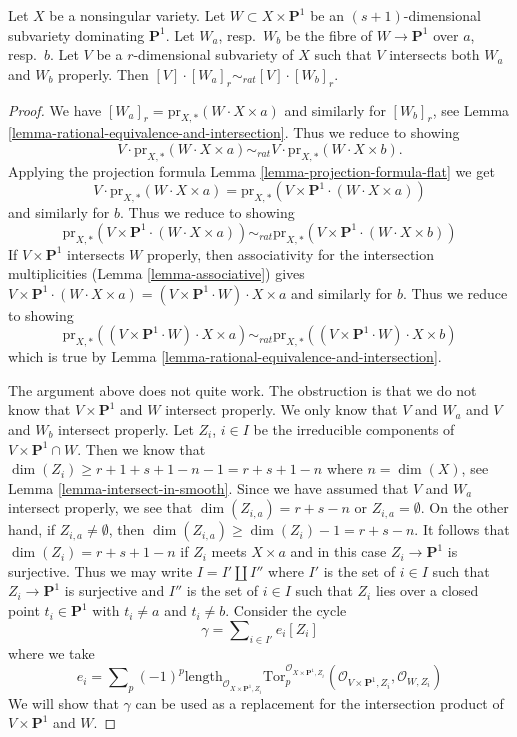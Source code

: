 \begin{lemma}
\label{lemma-well-defined-special-case}
Let $X$ be a nonsingular variety. Let
$W \subset X \times \mathbf{P}^1$ be an $(s + 1)$-dimensional subvariety
dominating $\mathbf{P}^1$. Let $W_a$, resp.\ $W_b$ be the fibre of
$W \to \mathbf{P}^1$ over $a$, resp.\ $b$. Let $V$ be a $r$-dimensional
subvariety of $X$ such that $V$ intersects both $W_a$ and
$W_b$ properly. Then $[V] \cdot [W_a]_r \sim_{rat} [V] \cdot [W_b]_r$.
\end{lemma}

\begin{proof}
We have $[W_a]_r = \text{pr}_{X,*}(W \cdot X \times a)$ and similarly for
$[W_b]_r$, see Lemma \ref{lemma-rational-equivalence-and-intersection}.
Thus we reduce to showing
$$
V \cdot \text{pr}_{X,*}( W \cdot X \times a) \sim_{rat} V \cdot
\text{pr}_{X,*}( W \cdot X\times b).
$$
Applying the projection formula
Lemma \ref{lemma-projection-formula-flat} we get
$$
V \cdot \text{pr}_{X,*}( W \cdot X\times a) =
\text{pr}_{X,*}(V \times \mathbf{P}^1 \cdot (W \cdot X\times a))
$$
and similarly for $b$. Thus we reduce to showing
$$
\text{pr}_{X,*}(V \times \mathbf{P}^1 \cdot (W \cdot X\times a))
\sim_{rat}
\text{pr}_{X,*}(V \times \mathbf{P}^1 \cdot (W \cdot X\times b))
$$
If $V \times \mathbf{P}^1$ intersects $W$ properly, then
associativity for the intersection multiplicities
(Lemma \ref{lemma-associative})
gives $V \times \mathbf{P}^1 \cdot (W \cdot X\times a) =
(V \times \mathbf{P}^1 \cdot W) \cdot X \times a$
and similarly for $b$.  Thus we reduce to showing
$$
\text{pr}_{X,*}((V \times \mathbf{P}^1 \cdot W) \cdot X\times a)
\sim_{rat}
\text{pr}_{X,*}((V \times \mathbf{P}^1 \cdot W) \cdot X\times b)
$$
which is true by Lemma \ref{lemma-rational-equivalence-and-intersection}.

\medskip\noindent
The argument above does not quite work. The obstruction is that
we do not know that $V \times \mathbf{P}^1$ and $W$ intersect properly.
We only know that $V$ and $W_a$ and $V$ and $W_b$ intersect properly.
Let $Z_i$, $i \in I$ be the irreducible components of
$V \times \mathbf{P}^1 \cap W$. Then we know that
$\dim(Z_i) \geq r + 1 + s + 1 - n - 1 = r + s + 1 - n$ where $n = \dim(X)$, see
Lemma \ref{lemma-intersect-in-smooth}. Since we have assumed
that $V$ and $W_a$ intersect properly, we see that
$\dim(Z_{i, a}) = r + s - n$ or $Z_{i, a} = \emptyset$.
On the other hand, if $Z_{i, a} \not = \emptyset$, then
$\dim(Z_{i, a}) \geq \dim(Z_i) - 1 = r + s - n$.
It follows that $\dim(Z_i) = r + s + 1 - n$ if $Z_i$ meets $X \times a$
and in this case $Z_i \to \mathbf{P}^1$ is surjective.
Thus we may write $I = I' \amalg I''$ where $I'$ is the set of $i \in I$
such that $Z_i \to \mathbf{P}^1$ is surjective and $I''$ is the set of
$i \in I$ such that $Z_i$ lies over a closed point $t_i \in \mathbf{P}^1$
with $t_i \not = a$ and $t_i \not = b$. Consider the cycle
$$
\gamma = \sum\nolimits_{i \in I'} e_i [Z_i]
$$
where we take
$$
e_i = \sum\nolimits_p (-1)^p
\text{length}_{\mathcal{O}_{X \times \mathbf{P}^1, Z_i}}
\text{Tor}_p^{\mathcal{O}_{X \times \mathbf{P}^1, Z_i}}(
\mathcal{O}_{V \times \mathbf{P}^1, Z_i}, \mathcal{O}_{W, Z_i})
$$
We will show that $\gamma$ can be used as a replacement for
the intersection product of $V \times \mathbf{P}^1$ and $W$.


\end{proof}
